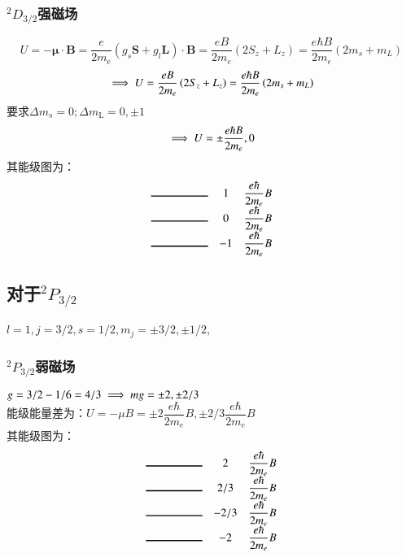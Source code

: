 \documentclass[UTF8,9pt]{ctexart}
\begin{document}
        \subsubsection{${}^2D_{3/2}$强磁场}
            $$U = - \boldsymbol { \mu } \cdot \boldsymbol { B } = \frac { e } { 2 m _ { \mathrm { e } } } \left( g _ { s } \boldsymbol { S } + g _ { l } \boldsymbol { L } \right) \cdot \boldsymbol { B }= \frac { e B } { 2 m _ { e } } \left( 2 S _ { z } + L _ { z } \right) = \frac { e \hbar B } { 2 m _ { e } } \left( 2 m _ { s } + m _ { L } \right)$$
            $$\implies U = \frac { e B } { 2 m _ { e } } \left( 2 S _ { z } + L _ { z } \right) = \frac { e \hbar B } { 2 m _ { e } } \left( 2 m _s + m _ { L } \right)$$
            要求$\Delta m _ { s } = 0 ; \Delta m _ { \mathrm { L } } = 0 , \pm 1$
            $$\implies U=\pm\frac { e \hbar B } { 2 m _ { e } },0$$
            其能级图为：$$\begin{matrix}
                \rule{50pt}{1pt}& 1 & \dfrac{e\hbar}{2m_e} B\\
                \rule{50pt}{1pt}& 0 & \dfrac{e\hbar}{2m_e} B\\
                \rule{50pt}{1pt}& -1 & \dfrac{e\hbar}{2m_e} B
            \end{matrix}$$
    \subsection{对于${}^2P_{3/2}$}
        $l=1,j=3/2,s=1/2,m_j=\pm3/2,\pm1/2$,
        \subsubsection{${}^2P_{3/2}$弱磁场}
            $g=3/2-1/6=4/3 \implies mg=\pm2,\pm2/3$\\
            能级能量差为：$U=-\mu B=\pm2\dfrac{e\hbar}{2m_e} B,\pm2/3\dfrac{e\hbar}{2m_e}B$\\
            其能级图为：$$\begin{matrix}
                \rule{50pt}{1pt}& 2&\dfrac{e\hbar}{2m_e} B\\
                \rule{50pt}{1pt}&2/3&\dfrac{e\hbar}{2m_e} B\\
                \rule{50pt}{1pt}&-2/3&\dfrac{e\hbar}{2m_e} B\\
                \rule{50pt}{1pt}&-2&\dfrac{e\hbar}{2m_e} B
            \end{matrix}$$
\end{document}
